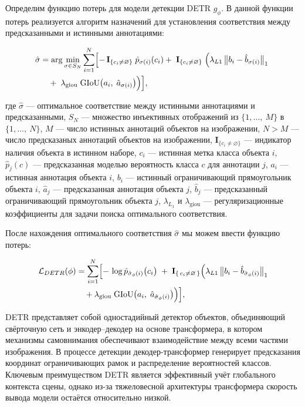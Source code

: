 Определим функцию потерь для модели детекции DETR\cite{DBLP:journals/corr/abs-2005-12872} $g_{\phi}$. В данной функции потерь реализуется алгоритм назначений для установления соответствия между предсказанными и истинными аннотациями:

\begin{align*}
\hat\sigma 
&= \arg\min_{\sigma\in S_N} \sum_{i=1}^N \Bigl[
-\,\mathbf{I}_{\{c_i\neq\varnothing\}}\;\hat p_{\sigma(i)}(c_i)
+\;\mathbf{I}_{\{c_i\neq\varnothing\}}\;\Bigl(\lambda_{L1}\,\bigl\lVert b_i - \hat b_{\sigma(i)}\bigr\rVert_{1}
\;
\\
&\quad
+
\;\lambda_{\mathrm{giou}}\;\mathrm{GIoU}\bigl(a_i,\;\hat a_{\sigma(i)}\bigr)\Bigr)
\Bigr],
\end{align*}

где $\hat\sigma$ — оптимальное соответствие между истинными аннотациями и предсказанными,
$S_N$ — множество инъективных отображений из ${\{1,\dots,\ M\}}$ в ${\{1,\dots, \ N\}}$,
$M$ — число истинных аннотаций объектов на изображении,
$N > M$ — число предсказаных аннотаций объектов на изображении,
$\mathbf{I}_{\{c_i\neq\varnothing\}}$ — индикатор наличия объекта в истинном наборе,
$c_i$ — истинная метка класса объекта $i$,
$\hat p_j(c)$ — предсказанная моделью вероятность класса $c$ для аннотации $j$,
$a_i$ — истинная аннотация объекта $i$, $b_i$ — истинный ограничивающий прямоугольник объекта $i$, 
$\hat a_j$ — предсказанная аннотация объекта $j$, $\hat b_j$ — предсказанный ограничивающий прямоугольник объекта $j$, $\lambda_{L_1}$ и $\lambda_{\text{giou}}$ — регуляризационные коэффициенты для задачи поиска оптимального соответствия.

После нахождения оптимального соответствия $\hat\sigma$ мы можем ввести функцию потерь:


\begin{align*}
\mathcal{L}_{DETR}(\phi)
&= \sum_{i=1}^N \Bigl[
-\,\log \hat p_{\hat\sigma_{\phi}(i)}\bigl(c_i\bigr)
\;+\;
\mathbf{I}_{\{\,c_i \neq \varnothing\,\}}\Bigl(
\lambda_{L1}\,\bigl\lVert b_i - \hat b_{\hat\sigma_{\phi}(i)}\bigr\rVert_{1}
\\
&\quad
+
\lambda_{\mathrm{giou}}\;{\mathrm{GIoU}}\bigl(a_i,\;\hat a_{\hat\sigma_{\phi}(i)}\bigr)
\Bigr)
\Bigr],
\end{align*}

DETR представляет собой одностадийный детектор объектов, объединяющий свёрточную сеть и энкодер–декодер на основе трансформера, в котором механизмы самовнимания обеспечивают взаимодействие между всеми частями изображения. В процессе детекции декодер-трансформер генерирует предсказания координат ограничивающих рамок и распределение вероятностей классов. Ключевым преимуществом DETR является эффективный учёт глобального контекста сцены, однако из-за тяжеловесной архитектуры трансформера скорость вывода модели остаётся относительно низкой.





